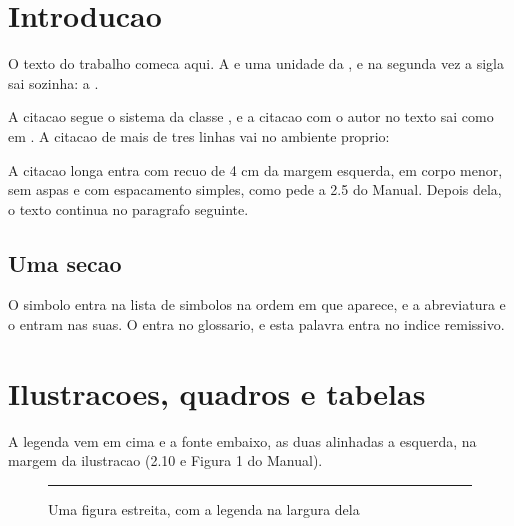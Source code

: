 \documentclass[grad]{ufrj}
\begin{document}
  \listoffigures
  \listofquadros
  \listoftables
  \printloabbreviations
  \printlosiglas
  \printlosymbols
  \tableofcontents

  \mainmatter

  \chapter{Introducao}
  \label{cap:introducao}
  O texto do trabalho comeca aqui. A  e uma unidade da
  , e na segunda vez a sigla sai sozinha: a .

  A citacao segue o sistema da classe \cite{m-4211}, e a citacao com o autor
  no texto sai como em \textcite{m-4212}. A citacao de mais de tres linhas vai
  no ambiente proprio:

  \begin{longquote}
    A citacao longa entra com recuo de 4 cm da margem esquerda, em corpo
    menor, sem aspas e com espacamento simples, como pede a 2.5 do Manual.
    Depois dela, o texto continua no paragrafo seguinte.
  \end{longquote}

  \section{Uma secao}
  O simbolo  entra na lista de
  simbolos na ordem em que aparece, e a abreviatura 
  e o  entram nas suas. O
  entra no glossario, e esta palavra entra no indice
  remissivo.

  \chapter{Ilustracoes, quadros e tabelas}
  \label{cap:ilustracoes}

  A legenda vem em cima e a fonte embaixo, as duas alinhadas a esquerda, na
  margem da ilustracao (2.10 e Figura 1 do Manual).

  \begin{figure}[htbp]
    \caption{Uma figura estreita, com a legenda na largura dela}
    \illustrationwidth{6cm}
    \centering
    \rule{6cm}{3cm}
  \end{figure}
\end{document}
